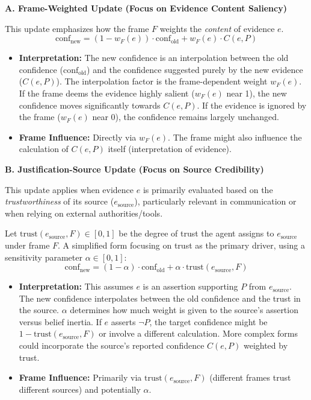 \documentclass[10pt,a4paper]{article}
\begin{document}
\textbf{A. Frame-Weighted Update (Focus on Evidence Content Saliency)}

This update emphasizes how the frame $F$ weights the \textit{content} of evidence $e$.
\begin{equation}
\label{eq:frame_weighted}
\mathrm{conf}_{\mathrm{new}} = (1 - w_F(e)) \cdot \mathrm{conf}_{\mathrm{old}} + w_F(e) \cdot C(e, P)
\end{equation}
\begin{itemize}
    \item \textbf{Interpretation:} The new confidence is an interpolation between the old confidence ($\mathrm{conf}_{\mathrm{old}}$) and the confidence suggested purely by the new evidence ($C(e, P)$). The interpolation factor is the frame-dependent weight $w_F(e)$. If the frame deems the evidence highly salient ($w_F(e)$ near 1), the new confidence moves significantly towards $C(e, P)$. If the evidence is ignored by the frame ($w_F(e)$ near 0), the confidence remains largely unchanged.
    \item \textbf{Frame Influence:} Directly via $w_F(e)$. The frame might also influence the calculation of $C(e, P)$ itself (interpretation of evidence).
\end{itemize}

\textbf{B. Justification-Source Update (Focus on Source Credibility)}

This update applies when evidence $e$ is primarily evaluated based on the \textit{trustworthiness} of its source ($e_{\mathrm{source}}$), particularly relevant in communication or when relying on external authorities/tools.

Let $\mathrm{trust}(e_{\mathrm{source}}, F) \in [0, 1]$ be the degree of trust the agent assigns to $e_{\mathrm{source}}$ under frame $F$. A simplified form focusing on trust as the primary driver, using a sensitivity parameter $\alpha \in [0,1]$:
\begin{equation}
\label{eq:source_trust}
\mathrm{conf}_{\mathrm{new}} = (1 - \alpha) \cdot \mathrm{conf}_{\mathrm{old}} + \alpha \cdot \mathrm{trust}(e_{\mathrm{source}}, F)
\end{equation}
\begin{itemize}
    \item \textbf{Interpretation:} This assumes $e$ is an assertion supporting $P$ from $e_{\mathrm{source}}$. The new confidence interpolates between the old confidence and the trust in the source. $\alpha$ determines how much weight is given to the source's assertion versus belief inertia. If $e$ asserts $\neg P$, the target confidence might be $1 - \mathrm{trust}(e_{\mathrm{source}}, F)$ or involve a different calculation. More complex forms could incorporate the source's reported confidence $C(e,P)$ weighted by trust.
    \item \textbf{Frame Influence:} Primarily via $\mathrm{trust}(e_{\mathrm{source}}, F)$ (different frames trust different sources) and potentially $\alpha$.
\end{itemize}
\end{document}
